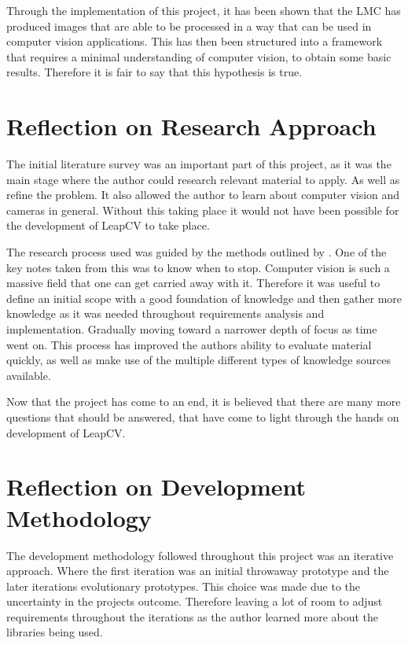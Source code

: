 \documentclass[11pt,oneside]{report}
\begin{document}
	Through the implementation of this project, it has been shown that the LMC has produced images that are able to be processed in a way that can be used in computer vision applications.
	This has then been structured into a framework that requires a minimal understanding of computer vision, to obtain some basic results.
	Therefore it is fair to say that this hypothesis is true.
	
	\section{Reflection on Research Approach}
		The initial literature survey was an important part of this project, as it was the main stage where the author could research relevant material to apply.
		As well as refine the problem.
		It also allowed the author to learn about computer vision and cameras in general.
		Without this taking place it would not have been possible for the development of LeapCV to take place.
		
		The research process used was guided by the methods outlined by .
		One of the key notes taken from this was to know when to stop.
		Computer vision is such a massive field that one can get carried away with it.
		Therefore it was useful to define an initial scope with a good foundation of knowledge and then gather more knowledge as it was needed throughout requirements analysis and implementation.
		Gradually moving toward a narrower depth of focus as time went on.
		This process has improved the authors ability to evaluate material quickly, as well as make use of the multiple different types of knowledge sources available.
		
		Now that the project has come to an end, it is believed that there are many more questions that should be answered, that have come to light through the hands on development of LeapCV.
	\section{Reflection on Development Methodology}
		The development methodology followed throughout this project was an iterative approach.
		Where the first iteration was an initial throwaway prototype and the later iterations evolutionary prototypes.
		This choice was made due to the uncertainty in the projects outcome.
		Therefore leaving a lot of room to adjust requirements throughout the iterations as the author learned more about the libraries being used.
		
\end{document}
